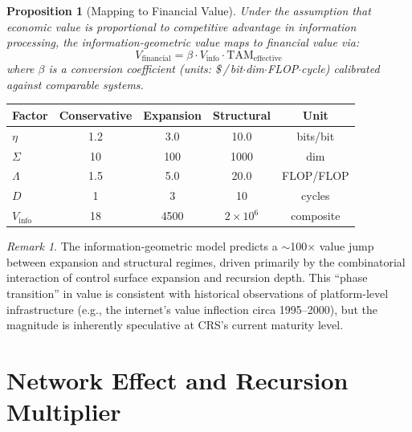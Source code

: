 \documentclass[11pt,a4paper]{article}
\newtheorem{proposition}[definition]{Proposition}
\theoremstyle{remark}
\newtheorem{remark}[definition]{Remark}
\newcommand{\TAM}{\mathrm{TAM}}
\newcommand{\speculative}[1]{\textcolor{red!70!black}{#1}}
\begin{document}
\begin{proposition}[Mapping to Financial Value]
\label{prop:info_to_financial}
Under the assumption that economic value is proportional to
competitive advantage in information processing, the
information-geometric value maps to financial value via:
\begin{equation}
  V_{\mathrm{financial}}
  = \beta \cdot V_{\mathrm{info}} \cdot \TAM_{\mathrm{effective}}
  \label{eq:info_to_fin}
\end{equation}
where $\beta$ is a conversion coefficient (units:
\$\,/\,bit$\cdot$dim$\cdot$FLOP$\cdot$cycle) calibrated against
comparable systems.
\end{proposition}

\begin{center}
\renewcommand{\arraystretch}{1.2}
\begin{tabular}{lcccc}
\toprule
\textbf{Factor} & \textbf{Conservative} & \textbf{Expansion} & \textbf{Structural} & \textbf{Unit} \\
\midrule
$\eta$    & 1.2  & 3.0   & 10.0   & bits/bit \\
$\Sigma$  & 10   & 100   & 1000   & dim \\
$\Lambda$ & 1.5  & 5.0   & 20.0   & FLOP/FLOP \\
$D$       & 1    & 3     & 10     & cycles \\
\midrule
$V_{\mathrm{info}}$ & 18 & 4500 & $2 \times 10^6$ & composite \\
\bottomrule
\end{tabular}
\end{center}

\begin{remark}
\speculative{The information-geometric model predicts a
$\sim$100$\times$ value jump between expansion and structural
regimes, driven primarily by the combinatorial interaction of
control surface expansion and recursion depth.  This ``phase
transition'' in value is consistent with historical observations
of platform-level infrastructure (e.g., the internet's value
inflection circa 1995--2000), but the magnitude is inherently
speculative at CRS's current maturity level.}
\end{remark}


\section{Network Effect and Recursion Multiplier}
\label{sec:network_recursion}
\end{document}
